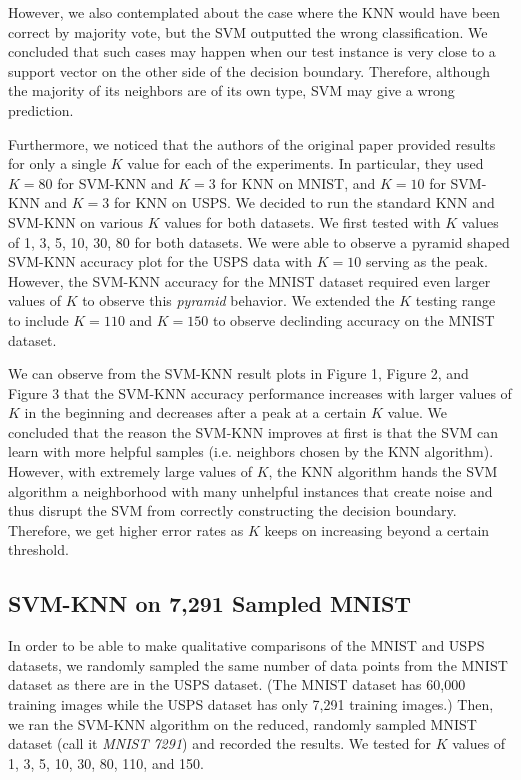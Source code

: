 \documentclass[11pt,letterpaper]{article}
\begin{document}
However, we also contemplated about the case where the KNN would have been correct by majority vote, but the SVM outputted the wrong classification. We concluded that such cases may happen when our test instance is very close to a support vector on the other side of the decision boundary. Therefore, although the majority of its neighbors are of its own type, SVM may give a wrong prediction.

Furthermore, we noticed that the authors of the original paper provided results for only a single $K$ value for each of the experiments. In particular, they used $K=80$ for SVM-KNN and $K=3$ for KNN on MNIST,  and $K=10$ for SVM-KNN and $K=3$ for KNN on USPS. We decided to run the standard KNN and SVM-KNN on various $K$ values for both datasets. We first tested with $K$ values of 1, 3, 5, 10, 30, 80 for both datasets. We were able to observe a pyramid shaped SVM-KNN accuracy plot for the USPS data with $K=10$ serving as the peak. However, the SVM-KNN accuracy for the MNIST dataset required even larger values of $K$ to observe this \textit{pyramid} behavior. We extended the $K$ testing range to include $K=110$ and $K=150$ to observe declinding accuracy on the MNIST dataset.

We can observe from the SVM-KNN result plots in Figure 1, Figure 2, and Figure 3 that the SVM-KNN accuracy performance increases with larger values of $K$ in the beginning and decreases after a peak at a certain $K$ value. We concluded that the reason the SVM-KNN improves at first is that the SVM can learn with more helpful samples (i.e. neighbors chosen by the KNN algorithm). However, with extremely large values of $K$, the KNN algorithm hands the SVM algorithm a neighborhood with many unhelpful instances that create noise and thus disrupt the SVM from correctly constructing the decision boundary. Therefore, we get higher error rates as $K$ keeps on increasing beyond a certain threshold.
 
\subsection{SVM-KNN on 7,291 Sampled MNIST}

In order to be able to make qualitative comparisons of the MNIST and USPS datasets, we randomly sampled the same number of data points from the MNIST dataset as there are in the USPS dataset. (The MNIST dataset has 60,000 training images while the USPS dataset has only 7,291 training images.) Then, we ran the SVM-KNN algorithm on the reduced, randomly sampled MNIST dataset (call it \textit{MNIST 7291}) and recorded the results. We tested for $K$ values of 1, 3, 5, 10, 30, 80, 110, and 150.
\end{document}
